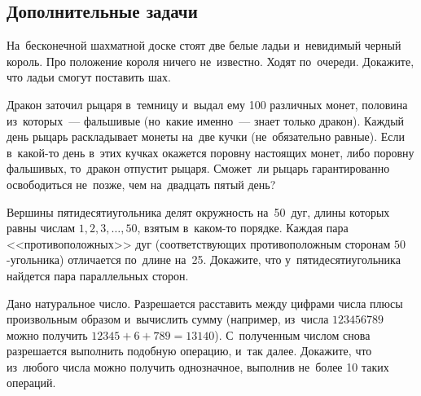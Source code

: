 

\subsection*{Дополнительные задачи}



\begin{problems}

\item
На~бесконечной шахматной доске стоят две белые ладьи и~невидимый черный король.
Про положение короля ничего не~известно.
Ходят по~очереди.
Докажите, что ладьи смогут поставить шах.

\item
Дракон заточил рыцаря в~темницу и~выдал ему 100 различных монет, половина
из~которых~--- фальшивые (но~какие именно~--- знает только дракон).
Каждый день рыцарь раскладывает монеты на~две кучки (не~обязательно равные).
Если в~какой-то день в~этих кучках окажется поровну настоящих монет, либо
поровну фальшивых, то~дракон отпустит рыцаря.
Сможет~ли рыцарь гарантированно освободиться не~позже, чем на~двадцать пятый
день?

\item
Вершины пятидесятиугольника делят окружность на~50~дуг, длины которых равны
числам $1, 2, 3, \ldots, 50$, взятым в~каком-то порядке.
Каждая пара <<противоположных>> дуг (соответствующих противоположным сторонам
$50$-угольника) отличается по~длине на~25.
Докажите, что у~пятидесятиугольника найдется пара параллельных сторон.

\item
Дано натуральное число.
Разрешается расставить между цифрами числа плюсы произвольным образом
и~вычислить сумму (например, из~числа $123456789$ можно получить
$12345 + 6 + 789 = 13140$).
С~полученным числом снова разрешается выполнить подобную операцию, и~так далее.
Докажите, что из~любого числа можно получить однозначное, выполнив не~более
10 таких операций.

\end{problems}

